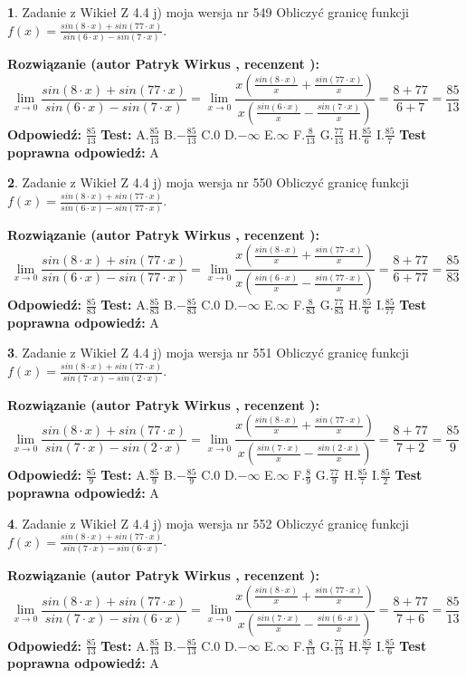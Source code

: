 \documentclass[12pt, a4paper]{article}
\theoremstyle{definition} %
\newtheorem{zad}{}
\newcommand{\zadStart}[1]{\begin{zad}#1\newline}
\newcommand{\zadStop}{\end{zad}}
\newcommand{\rozwStart}[2]{\noindent \textbf{Rozwiązanie (autor #1 , recenzent #2): }\newline}
\newcommand{\rozwStop}{\newline}
\newcommand{\odpStart}{\noindent \textbf{Odpowiedź:}\newline}
\newcommand{\odpStop}{\newline}
\newcommand{\testStart}{\noindent \textbf{Test:}\newline}
\newcommand{\testStop}{\newline}
\newcommand{\kluczStart}{\noindent \textbf{Test poprawna odpowiedź:}\newline}
\newcommand{\kluczStop}{\newline}
\begin{document}
\zadStart{Zadanie z Wikieł Z 4.4 j) moja wersja nr 549}
Obliczyć granicę funkcji $f(x)=\frac{sin(8\cdot x) +sin(77\cdot x)}{sin(6\cdot x) -sin(7\cdot x)}$.
\zadStop
\rozwStart{Patryk Wirkus}{}
$$\lim\limits_{x\to 0}\frac{sin(8\cdot x) +sin(77\cdot x)}{sin(6\cdot x) -sin(7\cdot x)}=\lim\limits_{x\to 0}\frac{x(\frac{sin(8\cdot x)}{x}+\frac{sin(77\cdot x)}{x})}{x(\frac{sin(6\cdot x)}{x}-\frac{sin(7\cdot x)}{x})}=\frac{8+77}{6+7} = \frac{85}{13}$$
\rozwStop
\odpStart
$\frac{85}{13}$
\odpStop
\testStart
A.$\frac{85}{13}$
B.$-\frac{85}{13}$
C.$0$
D.$-\infty$
E.$\infty$
F.$\frac{8}{13}$
G.$\frac{77}{13}$
H.$\frac{85}{6}$
I.$\frac{85}{7}$
\testStop
\kluczStart
A
\kluczStop



\zadStart{Zadanie z Wikieł Z 4.4 j) moja wersja nr 550}
Obliczyć granicę funkcji $f(x)=\frac{sin(8\cdot x) +sin(77\cdot x)}{sin(6\cdot x) -sin(77\cdot x)}$.
\zadStop
\rozwStart{Patryk Wirkus}{}
$$\lim\limits_{x\to 0}\frac{sin(8\cdot x) +sin(77\cdot x)}{sin(6\cdot x) -sin(77\cdot x)}=\lim\limits_{x\to 0}\frac{x(\frac{sin(8\cdot x)}{x}+\frac{sin(77\cdot x)}{x})}{x(\frac{sin(6\cdot x)}{x}-\frac{sin(77\cdot x)}{x})}=\frac{8+77}{6+77} = \frac{85}{83}$$
\rozwStop
\odpStart
$\frac{85}{83}$
\odpStop
\testStart
A.$\frac{85}{83}$
B.$-\frac{85}{83}$
C.$0$
D.$-\infty$
E.$\infty$
F.$\frac{8}{83}$
G.$\frac{77}{83}$
H.$\frac{85}{6}$
I.$\frac{85}{77}$
\testStop
\kluczStart
A
\kluczStop



\zadStart{Zadanie z Wikieł Z 4.4 j) moja wersja nr 551}
Obliczyć granicę funkcji $f(x)=\frac{sin(8\cdot x) +sin(77\cdot x)}{sin(7\cdot x) -sin(2\cdot x)}$.
\zadStop
\rozwStart{Patryk Wirkus}{}
$$\lim\limits_{x\to 0}\frac{sin(8\cdot x) +sin(77\cdot x)}{sin(7\cdot x) -sin(2\cdot x)}=\lim\limits_{x\to 0}\frac{x(\frac{sin(8\cdot x)}{x}+\frac{sin(77\cdot x)}{x})}{x(\frac{sin(7\cdot x)}{x}-\frac{sin(2\cdot x)}{x})}=\frac{8+77}{7+2} = \frac{85}{9}$$
\rozwStop
\odpStart
$\frac{85}{9}$
\odpStop
\testStart
A.$\frac{85}{9}$
B.$-\frac{85}{9}$
C.$0$
D.$-\infty$
E.$\infty$
F.$\frac{8}{9}$
G.$\frac{77}{9}$
H.$\frac{85}{7}$
I.$\frac{85}{2}$
\testStop
\kluczStart
A
\kluczStop



\zadStart{Zadanie z Wikieł Z 4.4 j) moja wersja nr 552}
Obliczyć granicę funkcji $f(x)=\frac{sin(8\cdot x) +sin(77\cdot x)}{sin(7\cdot x) -sin(6\cdot x)}$.
\zadStop
\rozwStart{Patryk Wirkus}{}
$$\lim\limits_{x\to 0}\frac{sin(8\cdot x) +sin(77\cdot x)}{sin(7\cdot x) -sin(6\cdot x)}=\lim\limits_{x\to 0}\frac{x(\frac{sin(8\cdot x)}{x}+\frac{sin(77\cdot x)}{x})}{x(\frac{sin(7\cdot x)}{x}-\frac{sin(6\cdot x)}{x})}=\frac{8+77}{7+6} = \frac{85}{13}$$
\rozwStop
\odpStart
$\frac{85}{13}$
\odpStop
\testStart
A.$\frac{85}{13}$
B.$-\frac{85}{13}$
C.$0$
D.$-\infty$
E.$\infty$
F.$\frac{8}{13}$
G.$\frac{77}{13}$
H.$\frac{85}{7}$
I.$\frac{85}{6}$
\testStop
\kluczStart
A
\kluczStop
\end{document}
